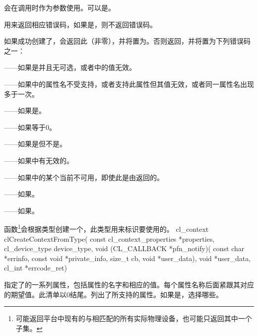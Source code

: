 会在调用时作为参数使用。可以是。

用来返回相应错误码，如果是，则不返回错误码。

如果成功创建了，会返回此（非零），并将置为。否则返回，并将置为下列错误码之一：
\startigBase
\item {}——如果是并且无可选，或者中的值无效。
\item {}——如果中的属性名不受支持，或者支持此属性但其值无效，或者同一属性名出现多于一次。
\item {}——如果是。
\item {}——如果等于0。
\item {}——如果是但不是。
\item {}——如果中有无效的。
\item {}——如果中的某个当前不可用，即使此是由返回的。
\item {}——如果\scdevfailres。
\item {}——如果\schostfailres。
\stopigBase

函数\footnote{可能返回平台中现有的与相匹配的所有实际物理设备，也可能只返回其中一个子集。}会根据类型创建一个\scopencl{}，此类型用来标识要使用的。
\startclc
cl_context clCreateContextFromType(
		const cl_context_properties *properties,
		cl_device_type device_type,
		void (CL_CALLBACK *pfn_notify)(
			const char *errinfo,
			const void *private_info,
			size_t cb,
			void *user_data),
		void *user_data,
		cl_int *errcode_ret)
\stopclc

指定了的一系列属性，包括属性的名字和相应的值。每个属性名称后面紧跟其对应的期望值。此清单以0结尾。列出了所支持的属性。如果是，选择哪些。


